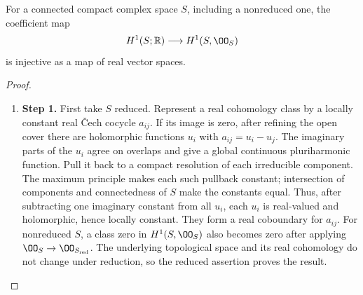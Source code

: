 \begin{proposition}\hypertarget{tag-01G5}{}\label{cdp:st:D.1.7}

For a connected compact complex space $S$, including a nonreduced
one, the coefficient map
\[
H^1(S;\mathbb R)\longrightarrow H^1(S,\OO_S)
\]
is injective as a map of real vector spaces.
\end{proposition}


\begin{proof}
\begin{enumerate}[label={$\langle1\rangle$\arabic*.},leftmargin=*]
\item 
\noindent\textbf{Step 1.} First take $S$ reduced. Represent a real cohomology class by a
locally constant real \v Cech cocycle $a_{ij}$. If its image is zero,
after refining the open cover there are holomorphic functions $u_i$
with $a_{ij}=u_i-u_j$. The imaginary parts of the $u_i$ agree on
overlaps and give a global continuous pluriharmonic function.
Pull it back to a compact resolution of each irreducible component.
The maximum principle makes each such pullback constant; intersection
of components and connectedness of $S$ make the constants equal.
Thus, after subtracting one imaginary constant from all $u_i$,
each $u_i$ is real-valued and holomorphic, hence locally constant.
They form a real coboundary for $a_{ij}$. For nonreduced $S$, a
class zero in $H^1(S,\OO_S)$ also becomes zero after applying
$\OO_S\to\OO_{S_{\rm red}}$. The underlying topological space
and its real cohomology do not change under reduction, so the
reduced assertion proves the result.

\end{enumerate}
\end{proof}